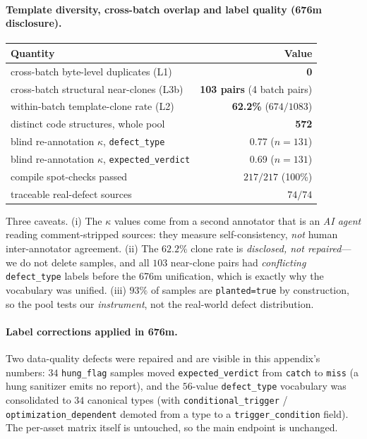 \paragraph{Template diversity, cross-batch overlap and label quality (676m disclosure).}
\begin{center}\footnotesize
\begin{tabular}{@{}lr@{}}
\toprule
Quantity & Value \\
\midrule
cross-batch byte-level duplicates (L1) & \textbf{0} \\
cross-batch structural near-clones (L3b) & \textbf{103 pairs} (4 batch pairs) \\
within-batch template-clone rate (L2) & \textbf{62.2\%} ($674/1083$) \\
distinct code structures, whole pool & \textbf{572} \\
blind re-annotation $\kappa$, \texttt{defect\_type} & 0.77 ($n{=}131$) \\
blind re-annotation $\kappa$, \texttt{expected\_verdict} & 0.69 ($n{=}131$) \\
compile spot-checks passed & $217/217$ (100\%) \\
traceable real-defect sources & $74/74$ \\
\bottomrule
\end{tabular}
\end{center}
Three caveats. (i) The $\kappa$ values come from a second annotator that is an \emph{AI agent}
reading comment-stripped sources: they measure self-consistency, \emph{not} human inter-annotator
agreement. (ii) The $62.2\%$ clone rate is \emph{disclosed, not repaired}---we do not delete samples,
and all $103$ near-clone pairs had \emph{conflicting} \texttt{defect\_type} labels before the
676m unification, which is exactly why the vocabulary was unified. (iii) $93\%$ of samples are
\texttt{planted=true} by construction, so the pool tests our \emph{instrument}, not the real-world
defect distribution.

\paragraph{Label corrections applied in 676m.}
Two data-quality defects were repaired and are visible in this appendix's numbers: $34$
\texttt{hung\_flag} samples moved \texttt{expected\_verdict} from \texttt{catch} to \texttt{miss}
(a hung sanitizer emits no report), and the $56$-value \texttt{defect\_type} vocabulary was
consolidated to $34$ canonical types (with \texttt{conditional\_trigger} /
\texttt{optimization\_dependent} demoted from a type to a \texttt{trigger\_condition} field). The
per-asset matrix itself is untouched, so the main endpoint is unchanged.

